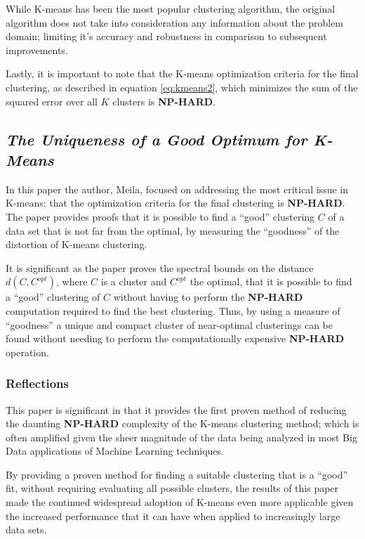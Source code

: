 \documentclass{article}
\newcommand{\bold}[1]{\textbf{#1}}
\begin{document}
While K-means has been the most popular clustering algorithm, the original algorithm does not take into consideration any information about the problem domain; limiting it's accuracy and robustness in comparison to subsequent improvements\cite{jain2010}. 

Lastly, it is important to note that the K-means optimization criteria for the final clustering, as described in equation \ref{eq:kmeans2}, which minimizes the sum of the squared error over all $K$ clusters is \bold{NP-HARD}\cite{drineas2004clustering}.








\subsection{\emph{The Uniqueness of a Good Optimum for K-Means}}

In this paper the author, Meila, focused on addressing the most critical issue in K-means; that the optimization criteria for the final clustering is \bold{NP-HARD}. The paper provides proofs that it is possible to find a ``good'' clustering $C$ of a data set that is not far from the optimal, by measuring the ``goodness'' of the distortion of K-means clustering.

It is significant as the paper proves the spectral bounds on the distance $d(C, C^{opt})$, where $C$ is a cluster and $C^{opt}$ the optimal, that it is possible to find a ``good'' clustering of $C$ without having to perform the \bold{NP-HARD} computation required to find the best clustering\cite{meilua2006uniqueness}. Thus, by using a measure of ``goodness'' a unique and compact cluster of near-optimal clusterings can be found without needing to perform the computationally expensive \bold{NP-HARD} operation\cite{meilua2006uniqueness}.


\subsubsection{Reflections}

This paper is significant in that it provides the first proven method of reducing the daunting \bold{NP-HARD} complexity of the K-means clustering method; which is often amplified given the sheer magnitude of the data being analyzed in most Big Data applications of Machine Learning techniques.

By providing a proven method for finding a suitable clustering that is a ``good'' fit, without requiring evaluating all possible clusters, the results of this paper made the continued widespread adoption of K-means even more applicable given the increased performance that it can have when applied to increasingly large data sets.
\end{document}
